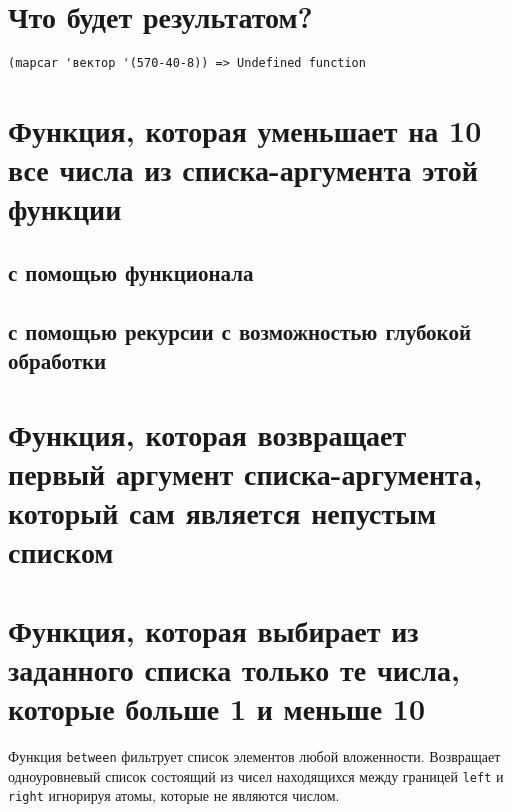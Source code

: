 
\section{Что будет результатом?}

\begin{lstlisting}
(mapcar 'вектор '(570-40-8)) => Undefined function
\end{lstlisting}



\section{Функция, которая уменьшает на 10 все числа из списка-аргумента этой функции}

\subsection{с помощью функционала}



\subsection{с помощью рекурсии с возможностью глубокой обработки}




\section{Функция, которая возвращает  первый  аргумент списка-аргумента, который сам является непустым списком}




\section{Функция, которая выбирает из заданного списка только те числа, которые больше 1 и меньше 10}

Функция \texttt{between} фильтрует список элементов любой вложенности. Возвращает одноуровневый список состоящий из чисел находящихся между границей \texttt{left} и \texttt{right} игнорируя атомы, которые не являются числом. 




